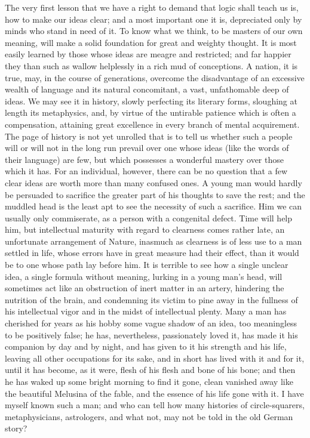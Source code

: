 The very first lesson that we have a right to demand that logic shall teach us is, how to make our ideas clear; and a most important one it is, depreciated only by minds who stand in need of it. To know what we think, to be masters of our own meaning, will make a solid foundation for great and weighty thought. It is most easily learned by those whose ideas are meagre and restricted; and far happier they than such as wallow helplessly in a rich mud of conceptions. A nation, it is true, may, in the course of generations, overcome the disadvantage of an excessive wealth of language and its natural concomitant, a vast, unfathomable deep of ideas. We may see it in history, slowly perfecting its literary forms, sloughing at length its metaphysics, and, by virtue of the untirable patience which is often a compensation, attaining great excellence in every branch of mental acquirement. The page of history is not yet unrolled that is to tell us whether such a people will or will not in the long run prevail over one whose ideas (like the words of their language) are few, but which  possesses a wonderful mastery over those which it has. For an individual, however, there can be no question that a few clear ideas are worth more than many confused ones. A young man would hardly be persuaded to sacrifice the greater part of his thoughts to save the rest; and the muddled head is the least apt to see the necessity of such a sacrifice. Him we can usually only commiserate, as a person with a congenital defect. Time will help him, but intellectual maturity with regard to clearness comes rather late, an unfortunate arrangement of Nature, inasmuch as clearness is of less use to a man settled in life, whose  errors have in great measure had their effect, than it would be to one whose path lay before him. It is terrible to see how a single unclear idea, a single formula without meaning, lurking in a young man's head, will sometimes act like an obstruction of inert matter in an artery, hindering the nutrition of the brain, and condemning its victim to pine away in the fullness of his intellectual vigor and in the midst of intellectual plenty. Many a man has cherished for years as his hobby some vague shadow of an idea, too meaningless to be positively false; he has, nevertheless, passionately loved it, has made it his companion by day and by night, and has given to it his strength and his life, leaving all other occupations for its sake, and in short has lived with it and for it, until it has become, as it were, flesh of his flesh and bone of his bone; and then he has waked up some bright morning to find it gone, clean vanished away like the beautiful Melusina of the fable, and the essence of his life gone with it. I have myself known such a man; and who can tell how many histories of circle-squarers, metaphysicians, astrologers, and what not, may not be told in the old German story?

